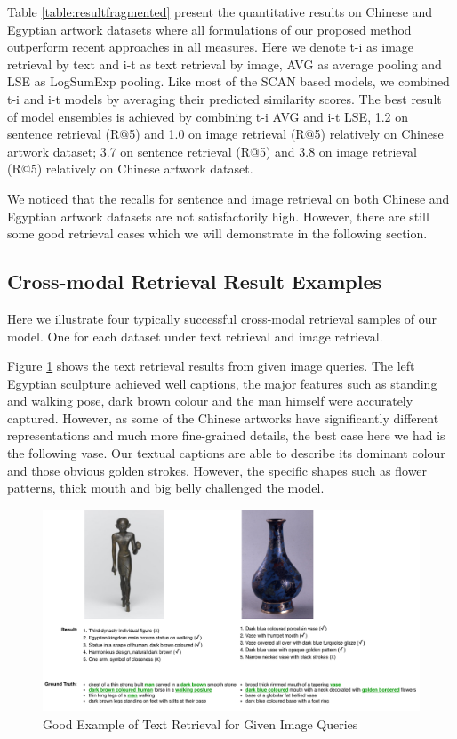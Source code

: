 Table \ref{table:resultfragmented} present the quantitative results on Chinese and Egyptian artwork datasets where all formulations of our proposed method outperform recent approaches in all measures. Here we denote t-i as image retrieval by text and i-t as text retrieval by image, AVG as average pooling and LSE as LogSumExp pooling. Like most of the SCAN based models, we combined t-i and i-t models by averaging their predicted similarity scores. The best result of model ensembles is achieved by combining t-i AVG and i-t LSE, 1.2 on sentence retrieval (R@5) and 1.0 on image retrieval (R@5) relatively on Chinese artwork dataset; 3.7 on sentence retrieval (R@5) and 3.8 on image retrieval (R@5) relatively on Chinese artwork dataset.

We noticed that the recalls for sentence and image retrieval on both Chinese and Egyptian artwork datasets are not satisfactorily high. However, there are still some good retrieval cases which we will demonstrate in the following section.

\subsection{Cross-modal Retrieval Result Examples}
Here we illustrate four typically successful cross-modal retrieval samples of our model. One for each dataset under text retrieval and image retrieval. 

Figure \ref{fig:i2t} shows the text retrieval results from given image queries. The left Egyptian sculpture achieved well captions, the major features such as standing and walking pose, dark brown colour and the man himself were accurately captured. However, as some of the Chinese artworks have significantly different representations and much more fine-grained details, the best case here we had is the following vase. Our textual captions are able to describe its dominant colour and those obvious golden strokes. However, the specific shapes such as flower patterns, thick mouth and big belly challenged the model.

\begin{figure}[h!]
\centering
\includegraphics[width=\textwidth]{i2t.pdf}
\caption{Good Example of Text Retrieval for Given Image Queries}
\label{fig:i2t}
\end{figure}

